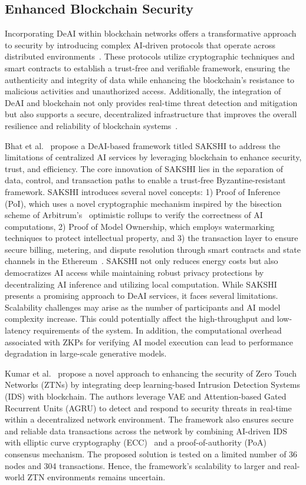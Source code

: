 \documentclass[5p,twocolumn]{elsarticle}
\begin{document}
\subsection{Enhanced Blockchain Security}
Incorporating DeAI within blockchain networks offers a transformative approach to security by introducing complex AI-driven protocols that operate across distributed environments~\cite{cao2022decentralized}. These protocols utilize cryptographic techniques and smart contracts to establish a trust-free and verifiable framework, ensuring the authenticity and integrity of data while enhancing the blockchain's resistance to malicious activities and unauthorized access. Additionally, the integration of DeAI and blockchain not only provides real-time threat detection and mitigation but also supports a secure, decentralized infrastructure that improves the overall resilience and reliability of blockchain systems~\cite{chavali2020ai}.

Bhat et al.~\cite{bhat2023sakshi} propose a DeAI-based framework titled SAKSHI to address the limitations of centralized AI services by leveraging blockchain to enhance security, trust, and efficiency. The core innovation of SAKSHI lies in the separation of data, control, and transaction paths to enable a trust-free Byzantine-resistant framework. SAKSHI introduces several novel concepts: 1) Proof of Inference (PoI), which uses a novel cryptographic mechanism inspired by the bisection scheme of Arbitrum's~\cite{kalodner2018arbitrum} optimistic rollups to verify the correctness of AI computations, 2) Proof of Model Ownership, which employs watermarking techniques to protect intellectual property, and 3) the transaction layer to ensure secure billing, metering, and dispute resolution through smart contracts and state channels in the Ethereum~\cite{web-ethereum}. SAKSHI not only reduces energy costs but also democratizes AI access while maintaining robust privacy protections by decentralizing AI inference and utilizing local computation. While SAKSHI presents a promising approach to DeAI services, it faces several limitations. Scalability challenges may arise as the number of participants and AI model complexity increase. This could potentially affect the high-throughput and low-latency requirements of the system. In addition, the computational overhead associated with ZKPs for verifying AI model execution can lead to performance degradation in large-scale generative models.

Kumar et al.~\cite{kumar2022deep} propose a novel approach to enhancing the security of Zero Touch Networks (ZTNs) by integrating deep learning-based Intrusion Detection Systems (IDS) with blockchain. The authors leverage VAE and Attention-based Gated Recurrent Units (AGRU) to detect and respond to security threats in real-time within a decentralized network environment. The framework also ensures secure and reliable data transactions across the network by combining AI-driven IDS with elliptic curve cryptography (ECC)~\cite{koblitz2000state} and a proof-of-authority (PoA)~\cite{kaur2021research} consensus mechanism. The proposed solution is tested on a limited number of 36 nodes and 304 transactions. Hence, the framework's scalability to larger and real-world ZTN environments remains uncertain.
\end{document}
